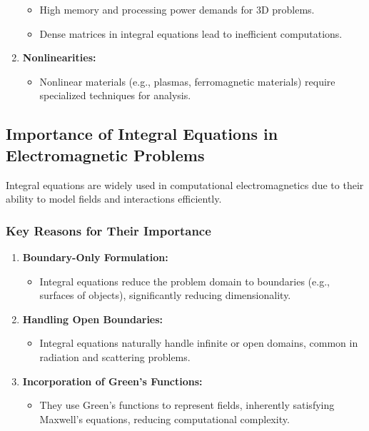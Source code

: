 \documentclass[12pt]{article}
\begin{document}
\begin{enumerate}
          \begin{itemize}
              \item High memory and processing power demands for 3D problems.
              \item Dense matrices in integral equations lead to inefficient computations.
          \end{itemize}
    \item \textbf{Nonlinearities:}
          \begin{itemize}
              \item Nonlinear materials (e.g., plasmas, ferromagnetic materials) require specialized techniques for analysis.
          \end{itemize}
\end{enumerate}

\subsection{Importance of Integral Equations in Electromagnetic Problems}
Integral equations are widely used in computational electromagnetics due to their ability to model fields and interactions efficiently.

\subsubsection{Key Reasons for Their Importance}
\begin{enumerate}
    \item \textbf{Boundary-Only Formulation:}
          \begin{itemize}
              \item Integral equations reduce the problem domain to boundaries (e.g., surfaces of objects), significantly reducing dimensionality.
          \end{itemize}
    \item \textbf{Handling Open Boundaries:}
          \begin{itemize}
              \item Integral equations naturally handle infinite or open domains, common in radiation and scattering problems.
          \end{itemize}
    \item \textbf{Incorporation of Green’s Functions:}
          \begin{itemize}
              \item They use Green’s functions to represent fields, inherently satisfying Maxwell’s equations, reducing computational complexity.
          \end{itemize}
\end{enumerate}
\end{document}
